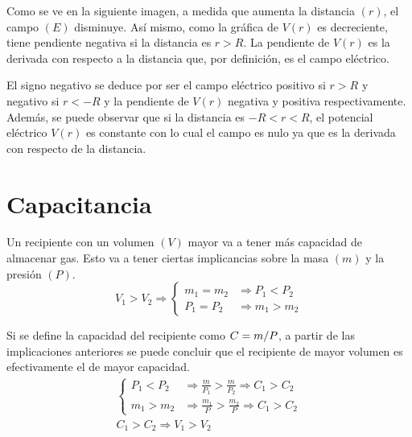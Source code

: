 \documentclass[a5paper,12pt,twoside]{book}
\begin{document}
Como se ve en la siguiente imagen, a medida que aumenta la distancia $(r)$, el campo $(E)$ disminuye. Así mismo, como la gráfica de $V(r)$ es decreciente, tiene pendiente negativa si la distancia es $r>R$. La pendiente de $V(r)$ es la derivada con respecto a la distancia que, por definición, es el campo eléctrico.

\begin{center}
    \def\svgwidth{0.8\linewidth}
    
\end{center}

El signo negativo se deduce por ser el campo eléctrico positivo si $r>R$ y negativo si $r<-R$ y la pendiente de $V(r)$ negativa y positiva respectivamente. Además, se puede observar que si la distancia es $-R<r<R$, el potencial eléctrico $V(r)$ es constante con lo cual el campo es nulo ya que es la derivada con respecto de la distancia.


\section{Capacitancia}

Un recipiente con un volumen $(V)$ mayor va a tener más capacidad de almacenar gas. Esto va a tener ciertas implicancias sobre la masa $(m)$ y la presión $(P)$.
\begin{equation*}
    V_1 > V_2 \Rightarrow
    \left\{
    \begin{aligned}
        m_1 = m_2 & \Rightarrow P_1 < P_2
        \\
        P_1 = P_2 & \Rightarrow m_1 > m_2
    \end{aligned}
    \right.
\end{equation*}

Si se define la capacidad del recipiente como $C= m/P$, a partir de las implicaciones anteriores se puede concluir que el recipiente de mayor volumen es efectivamente el de mayor capacidad.
\begin{gather*}
    \left\{
    \begin{aligned}
        P_1 < P_2 & \Rightarrow \frac{m}{P_1} > \frac{m}{P_2} \Rightarrow C_1 > C_2
        \\[1ex]
        m_1 > m_2 & \Rightarrow \frac{m_1}{P} > \frac{m_2}{P} \Rightarrow C_1 > C_2
    \end{aligned}
    \right.
    \\[1em]
    C_1 > C_2 \Rightarrow V_1 > V_2
\end{gather*}
\end{document}
